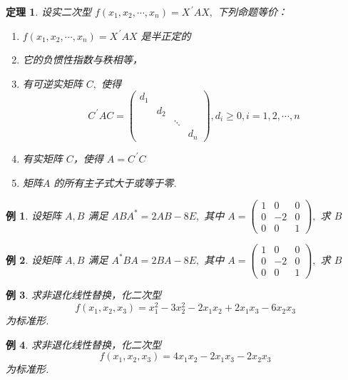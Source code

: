 \documentclass[13pt]{beamer}
\newtheorem{thm}{定理}
\newtheorem{exa}{例}
\begin{document}
\begin{frame}
\begin{thm}
设实二次型 $f\left(x_{1}, x_{2}, \cdots, x_{n}\right)=X^{\,\prime} A X,$ 下列命题等价：
\begin{enumerate}
	\item $f\left(x_{1}, x_{2}, \cdots, x_{n}\right)=X^{\, \prime} A X$ 是半正定的
	\item 它的负惯性指数与秩相等，
	\item 有可逆实矩阵 $C,$ 使得
\[
C^{\, \prime} A C=\left(\begin{array}{cccc}
d_{1} & & & \\
& d_{2} & & \\
& & \ddots & \\
& & & d_{n}
\end{array}\right), d_{i} \geq 0, i=1,2, \cdots, n
\]
	\item 有实矩阵 $C$，使得 $A=C^{\, \prime} C$
 	\item 矩阵$A$ 的所有主子式大于或等于零.
\end{enumerate}
\end{thm}
\end{frame}


\setcounter{exa}{0}
\begin{frame}
\begin{exa}
设矩阵 $A, B$ 满足 $A B A^{*}=2 A B-8 E,$ 其中 $A=\left(\begin{array}{ccc}1 & 0 & 0 \\ 0 & -2 & 0 \\ 0 & 0 & 1\end{array}\right),$ 求 $B$
\end{exa}

\begin{exa}
设矩阵 $A, B$ 满足 $A^{*} B A=2 B A-8 E,$ 其中 $A=\left(\begin{array}{ccc}1 & 0 & 0 \\ 0 & -2 & 0 \\ 0 & 0 & 1\end{array}\right),$ 求 $B$
\end{exa}
\end{frame}


\begin{frame}
\begin{exa}
求非退化线性替换，化二次型 $$f\left(x_{1}, x_{2}, x_{3}\right)=x_{1}^{2}-3 x_{2}^{2}-2 x_{1} x_{2}+2 x_{1} x_{3}-6 x_{2} x_{3}$$ 为标准形.
\end{exa}
\begin{exa}
求非退化线性替换，化二次型 $$f\left(x_{1}, x_{2}, x_{3}\right)=4 x_{1} x_{2}-2 x_{1} x_{3}-2 x_{2} x_{3}$$ 为标准形.
\end{exa}
\end{frame}
\end{document}
